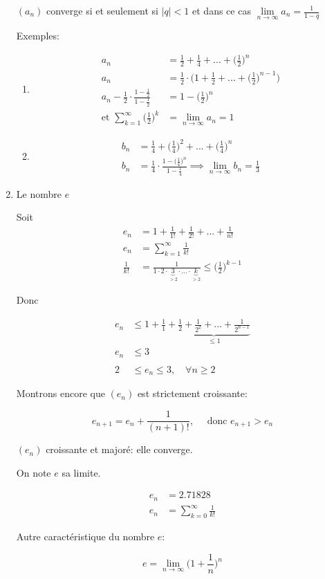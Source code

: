 \documentclass[
    11pt,
    a4paper,
    oneside,
    headinlcude, footinclude,
    twoside,
]{report}
\begin{document}
\begin{enumerate}
$(a_{n})$ converge si et seulement si $| q | < 1$ et dans ce cas $\lim\limits_{n
\to \infty} a _{n} = \frac{1}{1-q}$

Exemples:

\begin{enumerate}
\item 
\[
\begin{split}
a_{n} &= \frac{1}{2} + \frac{1}{4} + ... + \Big(\frac{1}{2}\Big)^{n} \\
a_{n} &= \frac{1}{2} \cdot \Big(1 + \frac{1}{2} + ... + \Big(\frac{1}{2}\Big)^{n-1}\Big)\\
a_{n} - \frac{1}{2} \cdot \frac{1-\frac{1}{2}}{1-\frac{1}{2}}
&= 1 - \Big(\frac{1}{2}\Big)^{n}\\
\textrm{et } \sum_{k = 1}^{\infty}
\Big(\frac{1}{2}\Big)^{k} &= \lim_{n \to \infty} a_{n}
= 1
\end{split}
\]
\item 
\[
\begin{split}
b_{n} &= \frac{1}{4} + \Big(\frac{1}{4}\Big)^{2} + ... + \Big(\frac{1}{4}\Big)^{n}\\
b_{n} &= \frac{1}{4} \cdot \frac{1-\Big(\frac{1}{4}\Big)^{n}}{1-\frac{1}{4}}
\implies \lim_{n \to \infty} b_{n} = \frac{1}{3}
\end{split}
\]
\end{enumerate}
\item Le nombre $e$

Soit  
\[
\begin{split}
e_{n} &= 1 + \frac{1}{1!} + \frac{1}{2!} + ... +
\frac{1}{n!}\\
e_{n} &= \sum^{\infty}_{k=1} \frac{1}{k!} \\
\frac{1}{k!} &= \frac{1}{1 \cdot 2 \cdot
\underbrace{3}_{>2} \cdot ... \cdot
\underbrace{k}_{>2}} \leq
\Big(\frac{1}{2}\Big)^{k-1}
\end{split}
\]

Donc

\[
\begin{split}
e_{n} &\leq 1 + \frac{1}{1} + \underbrace{\frac{1}{2}
+ \frac{1}{2^{2}} + ... + \frac{1}{2^{n-1}}}_{\leq
1}\\ 
e_{n} &\leq 3\\
\\
2 &\leq e_{n} \leq 3, \quad \forall n \geq 2
\end{split}
\]

Montrons encore que $(e_{n})$ est strictement croissante:

$$ e_{n+1} = e_{n} + \frac{1}{(n+1)!}, \quad \textrm{ donc } e_{n+1}
> e_{n}$$

$(e_{n})$ croissante et majoré: elle converge.

On note $e$ sa limite.

\[
\begin{split}
e_{n} &= 2.71828 \\
e_{n} &= \sum^{\infty}_{k=0} \frac{1}{k!}
\end{split}
\]

Autre caractéristique du nombre $e$:
                 
$$ e = \lim_{n \to \infty} \Big(1 + \frac{1}{n}\Big)^{n}$$
\end{enumerate}
\end{document}
